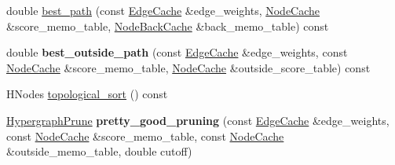 \begin{DoxyCompactItemize}
\item 
double \hyperlink{classScarab_1_1HG_1_1HypergraphAlgorithms_aa9a28bf42d17a166ec5e780067e33259}{best\_\-path} (const \hyperlink{classCache}{EdgeCache} \&edge\_\-weights, \hyperlink{classCache}{NodeCache} \&score\_\-memo\_\-table, \hyperlink{classCache}{NodeBackCache} \&back\_\-memo\_\-table) const 
\item 
\hypertarget{classScarab_1_1HG_1_1HypergraphAlgorithms_a8eea2c8f3cd86a08962b46d1a4c57a20}{
double {\bfseries best\_\-outside\_\-path} (const \hyperlink{classCache}{EdgeCache} \&edge\_\-weights, const \hyperlink{classCache}{NodeCache} \&score\_\-memo\_\-table, \hyperlink{classCache}{NodeCache} \&outside\_\-score\_\-table) const }
\label{classScarab_1_1HG_1_1HypergraphAlgorithms_a8eea2c8f3cd86a08962b46d1a4c57a20}

\item 
HNodes \hyperlink{classScarab_1_1HG_1_1HypergraphAlgorithms_afeb33bac104955747948b3d4a885cdc4}{topological\_\-sort} () const 
\item 
\hypertarget{classScarab_1_1HG_1_1HypergraphAlgorithms_a3b26656f35480c12e79f4040dce7bae1}{
\hyperlink{structScarab_1_1HG_1_1HypergraphPrune}{HypergraphPrune} {\bfseries pretty\_\-good\_\-pruning} (const \hyperlink{classCache}{EdgeCache} \&edge\_\-weights, const \hyperlink{classCache}{NodeCache} \&score\_\-memo\_\-table, const \hyperlink{classCache}{NodeCache} \&outside\_\-memo\_\-table, double cutoff)}
\label{classScarab_1_1HG_1_1HypergraphAlgorithms_a3b26656f35480c12e79f4040dce7bae1}

\end{DoxyCompactItemize}



